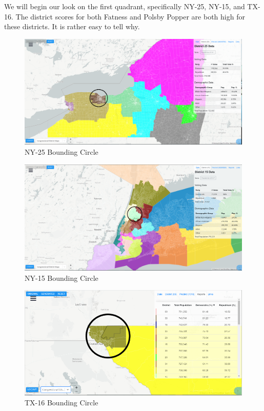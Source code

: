 \documentclass[letterpaper]{article}
\begin{document}
We will begin our look on the first quadrant, specifically NY-25, NY-15, and TX-16. The district scores for both Fatness and Polsby Popper are both high for these districts. It is rather easy to tell why.

\begin{figure}[H]
	\includegraphics[width=\linewidth]{./figures/NY-25-BoundingCircle.png}
	\caption{NY-25 Bounding Circle}
	\label{fig:ny25boundingCircle}
\end{figure}

\begin{figure}[H]
	\includegraphics[width=\linewidth]{./figures/NY-15-BoundingCircle.png}
	\caption{NY-15 Bounding Circle}
	\label{fig:ny15boundingCircle}
\end{figure}

\begin{figure}[H]
	\includegraphics[width=\linewidth]{./figures/TX-16-BoundingCircle.png}
	\caption{TX-16 Bounding Circle}
	\label{fig:tx16boundingCircle}
\end{figure}
\end{document}
